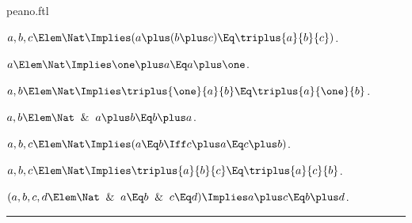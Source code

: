 \documentclass{stex}
\begin{document}
\begin{smodule}{peano.ftl}
\begin{forthel}
  \begin{theorem*}[title=23,id=P23]
    $a,b,c \Elem \Nat \Implies (a \plus (b \plus c) \Eq \triplus{a}{b}{c})$.
  \end{theorem*}

  \begin{theorem*}[title=24,id=P24]
    $a \Elem \Nat \Implies \one \plus a \Eq a \plus \one$.
  \end{theorem*}

  \begin{theorem*}[title=24',id=P24prime]
    $a,b \Elem \Nat \Implies \triplus{\one}{a}{b} \Eq \triplus{a}{\one}{b}$.
  \end{theorem*}

  \begin{theorem*}[title=25,id=P25]
    $a,b \Elem \Nat \And a \plus b \Eq b \plus a$.
  \end{theorem*}

  \begin{theorem*}[title=26,id=P26]
    $a,b,c \Elem \Nat \Implies (a \Eq b \Iff c \plus a \Eq c \plus b)$.
  \end{theorem*}

  \begin{theorem*}[title=27,id=P27]
    $a,b,c \Elem \Nat \Implies \triplus{a}{b}{c} \Eq \triplus{a}{c}{b}$.
  \end{theorem*}

  \begin{theorem*}[title=28,id=P28]
    $(a,b,c,d \Elem \Nat \And a \Eq b \And c \Eq d) \Implies a \plus c \Eq b \plus d$.
  \end{theorem*}
\end{forthel}

\vspace{1em}\hrule

\titleformat{\section}[hang]{\Large\bfseries}{}{0em}{}

\printbibliography
{}

\end{smodule}
\end{document}
